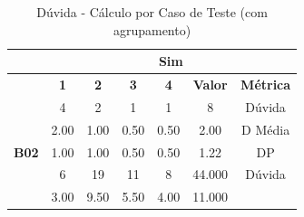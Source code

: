 \begin{table}[htbp]
	\centering
	\caption{Dúvida - Cálculo por Caso de Teste (com agrupamento)}
	\begin{tabular}{|ccccccc|}
		\hline
		\rowcolor[HTML]{D0CECE} 
		\rowcolor[HTML]{F2F2F2} 
		\multicolumn{1}{|l|}{\cellcolor[HTML]{F2F2F2}\textbf{Agrupamento}} &
		\multicolumn{6}{c|}{\cellcolor[HTML]{F2F2F2}\textbf{Sim}} \\ \hline
		\rowcolor[HTML]{D0CECE} 
		\multicolumn{1}{|c|}{\cellcolor[HTML]{D0CECE}\textbf{Participante}} &
		\multicolumn{1}{c|}{\cellcolor[HTML]{D0CECE}\textbf{1}} &
		\multicolumn{1}{c|}{\cellcolor[HTML]{D0CECE}\textbf{2}} &
		\multicolumn{1}{c|}{\cellcolor[HTML]{D0CECE}\textbf{3}} &
		\multicolumn{1}{c|}{\cellcolor[HTML]{D0CECE}\textbf{4}} &
		\multicolumn{1}{c|}{\cellcolor[HTML]{D0CECE}\textbf{Valor}} &
		\textbf{Métrica} \\ \hline
		\multicolumn{1}{|c|}{\cellcolor[HTML]{F2F2F2}} &
		\multicolumn{1}{c|}{4} &
		\multicolumn{1}{c|}{2} &
		\multicolumn{1}{c|}{1} &
		\multicolumn{1}{c|}{1} &
		\multicolumn{1}{c|}{8} &
		Dúvida \\ \cline{2-7} 
		\rowcolor[HTML]{D9D9D9} 
		\multicolumn{1}{|c|}{\cellcolor[HTML]{F2F2F2}} &
		\multicolumn{1}{c|}{\cellcolor[HTML]{D9D9D9}2.00} &
		\multicolumn{1}{c|}{\cellcolor[HTML]{D9D9D9}1.00} &
		\multicolumn{1}{c|}{\cellcolor[HTML]{D9D9D9}0.50} &
		\multicolumn{1}{c|}{\cellcolor[HTML]{D9D9D9}0.50} &
		\multicolumn{1}{c|}{\cellcolor[HTML]{D9D9D9}2.00} &
		D Média \\ \cline{2-7} 
		\multicolumn{1}{|c|}{\multirow{-3}{*}{\cellcolor[HTML]{F2F2F2}\textbf{B02}}} &
		\multicolumn{1}{c|}{1.00} &
		\multicolumn{1}{c|}{1.00} &
		\multicolumn{1}{c|}{0.50} &
		\multicolumn{1}{c|}{0.50} &
		\multicolumn{1}{c|}{1.22} &
		DP \\ \hline
		\rowcolor[HTML]{D9D9D9} 
		\multicolumn{1}{|c|}{\cellcolor[HTML]{F2F2F2}} &
		\multicolumn{1}{c|}{\cellcolor[HTML]{D9D9D9}6} &
		\multicolumn{1}{c|}{\cellcolor[HTML]{D9D9D9}19} &
		\multicolumn{1}{c|}{\cellcolor[HTML]{D9D9D9}11} &
		\multicolumn{1}{c|}{\cellcolor[HTML]{D9D9D9}8} &
		\multicolumn{1}{c|}{\cellcolor[HTML]{D9D9D9}44.000} &
		Dúvida \\ \cline{2-7} 
		\multicolumn{1}{|c|}{\cellcolor[HTML]{F2F2F2}} &
		\multicolumn{1}{c|}{3.00} &
		\multicolumn{1}{c|}{9.50} &
		\multicolumn{1}{c|}{5.50} &
		\multicolumn{1}{c|}{4.00} &
		\multicolumn{1}{c|}{11.000} &

\end{tabular}
\end{table}
